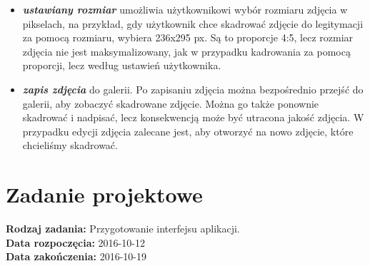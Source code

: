 \begin{itemize}
\begin{itemize}
\item \textit{\textbf{ustawiany rozmiar}} umożliwia użytkownikowi wybór rozmiaru zdjęcia w pikselach, na przykład, gdy użytkownik chce skadrować zdjęcie do legitymacji za pomocą rozmiaru, wybiera 236x295 px. Są to proporcje 4:5, lecz rozmiar zdjęcia nie jest maksymalizowany, jak w przypadku kadrowania za pomocą proporcji, lecz według ustawień użytkownika.
\item \textit{\textbf{zapis zdjęcia}} do galerii. Po zapisaniu zdjęcia można bezpośrednio przejść do galerii, aby zobaczyć skadrowane zdjęcie. Można go także ponownie skadrować i nadpisać, lecz konsekwencją może być utracona jakość zdjęcia. W przypadku edycji zdjęcia zalecane jest, aby otworzyć na nowo zdjęcie, które chcieliśmy skadrować. 
\end{itemize}
\end{itemize}

\section{Zadanie projektowe}
\noindent\textbf{Rodzaj zadania:}  Przygotowanie interfejsu aplikacji.\\

\noindent\textbf{Data rozpoczęcia:} 2016-10-12\\

\noindent\textbf{Data zakończenia:} 2016-10-19\\
\\


